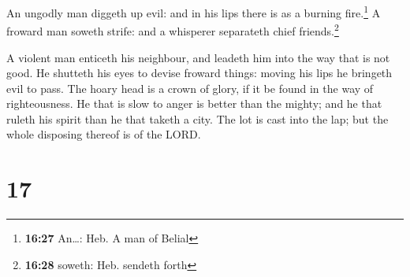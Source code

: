  An ungodly man diggeth up evil: and in his lips there is
as a burning fire.\footnote{\textbf{16:27} An\ldots: Heb. A man of
  Belial}  A froward man soweth strife: and a whisperer
separateth chief friends.\footnote{\textbf{16:28} soweth: Heb. sendeth
  forth}

 A violent man enticeth his neighbour, and leadeth him
into the way that is not good.  He shutteth his eyes to
devise froward things: moving his lips he bringeth evil to pass.
 The hoary head is a crown of glory, if it be found in
the way of righteousness.  He that is slow to anger is
better than the mighty; and he that ruleth his spirit than he that
taketh a city.  The lot is cast into the lap; but the
whole disposing thereof is of the LORD.

\hypertarget{section-16}{%
\section{17}\label{section-16}}


